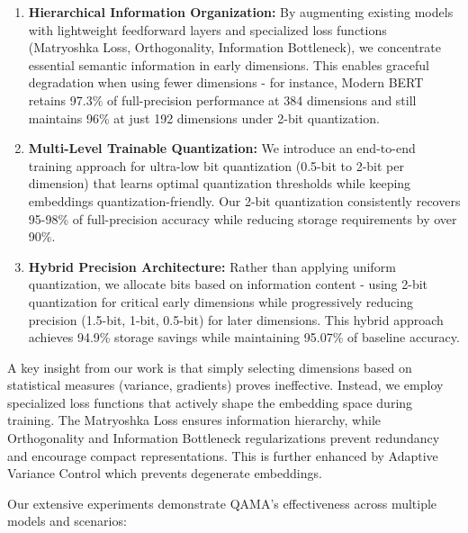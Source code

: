 \begin{enumerate}
    \item \textbf{Hierarchical Information Organization:} By augmenting existing models with lightweight feedforward layers and specialized loss functions (Matryoshka Loss, Orthogonality, Information Bottleneck), we concentrate essential semantic information in early dimensions. This enables graceful degradation when using fewer dimensions - for instance, Modern BERT retains 97.3\% of full-precision performance at 384 dimensions and still maintains 96\% at just 192 dimensions under 2-bit quantization.
    
    \item \textbf{Multi-Level Trainable Quantization:} We introduce an end-to-end training approach for ultra-low bit quantization (0.5-bit to 2-bit per dimension) that learns optimal quantization thresholds while keeping embeddings quantization-friendly. Our 2-bit quantization consistently recovers 95-98\% of full-precision accuracy while reducing storage requirements by over 90\%.
    
    \item \textbf{Hybrid Precision Architecture:} Rather than applying uniform quantization, we allocate bits based on information content - using 2-bit quantization for critical early dimensions while progressively reducing precision (1.5-bit, 1-bit, 0.5-bit) for later dimensions. This hybrid approach achieves 94.9\% storage savings while maintaining 95.07\% of baseline accuracy.
\end{enumerate}

A key insight from our work is that simply selecting dimensions based on statistical measures (variance, gradients) proves ineffective. Instead, we employ specialized loss functions that actively shape the embedding space during training. The Matryoshka Loss ensures information hierarchy, while Orthogonality and Information Bottleneck regularizations prevent redundancy and encourage compact representations. This is further enhanced by Adaptive Variance Control which prevents degenerate embeddings.

Our extensive experiments demonstrate QAMA's effectiveness across multiple models and scenarios:

